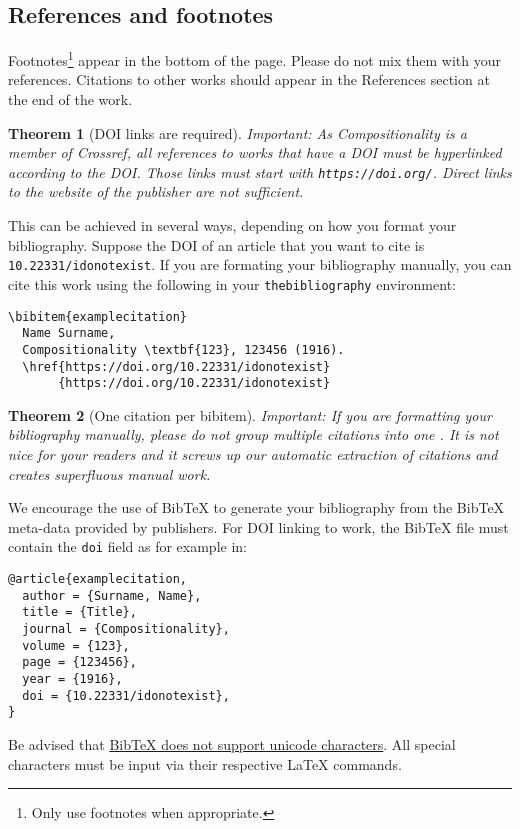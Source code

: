 \documentclass[
    accepted=2020-05-01,
    published=true,
    issue=1, 
    volume=2, 
    a4paper,
]{compositionalityarticle}
\newtheorem{theorem}{Theorem}
\begin{document}
\subsection{References and footnotes}
\label{sec:subsec1}
Footnotes\footnote{Only use footnotes when appropriate.} appear in the bottom of the page.
Please do not mix them with your references.
Citations to other works should appear in the References section at the end of the work.

\begin{theorem}[DOI links are required]
  Important: As Compositionality is a member of Crossref, all references to works that have a DOI must be hyperlinked according to the DOI. Those links must start with \texttt{https://doi.org/}. Direct links to the website of the publisher are not sufficient.
\end{theorem}

This can be achieved in several ways, depending on how you format your bibliography.
Suppose the DOI of an article \cite{examplecitation} that you want to cite is \texttt{10.22331/idonotexist}.
If you are formating your bibliography manually, you can cite this work using the following in your \texttt{thebibliography} environment:
\begin{verbatim}
\bibitem{examplecitation}
  Name Surname,
  Compositionality \textbf{123}, 123456 (1916).
  \href{https://doi.org/10.22331/idonotexist}
       {https://doi.org/10.22331/idonotexist}
\end{verbatim}

\begin{theorem}[One citation per bibitem]
  Important: If you are formatting your bibliography manually, please do not group multiple citations into one \texttt{\string\bibitem}.
  It is not nice for your readers and it screws up our automatic extraction of citations and creates superfluous manual work.
\end{theorem}

We encourage the use of BibTeX to generate your bibliography from the BibTeX meta-data provided by publishers.
For DOI linking to work, the BibTeX file must contain the \texttt{doi} field as for example in:
\begin{verbatim}
@article{examplecitation,
  author = {Surname, Name},
  title = {Title},
  journal = {Compositionality},
  volume = {123},
  page = {123456},
  year = {1916},
  doi = {10.22331/idonotexist},
}
\end{verbatim}

Be advised that \href{http://wiki.lyx.org/BibTeX/Tips}{BibTeX does not support unicode characters}.
All special characters must be input via their respective LaTeX commands.
\end{document}
